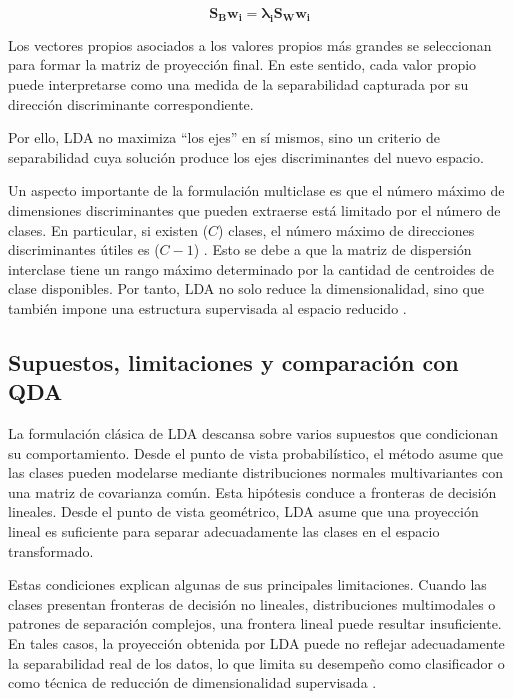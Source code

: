 \begin{equation}
	\mathbf{S_Bw_i = \lambda_iS_Ww_i}
	\label{eq:EMT7}
\end{equation}

Los vectores propios asociados a los valores propios más grandes se seleccionan para formar la matriz de proyección final. En este sentido, cada valor propio puede interpretarse como una medida de la separabilidad capturada por su dirección discriminante correspondiente.

Por ello, LDA no maximiza “los ejes” en sí mismos, sino un criterio de separabilidad cuya solución produce los ejes discriminantes del nuevo espacio.


Un aspecto importante de la formulación multiclase es que el número máximo de dimensiones discriminantes que pueden extraerse está limitado por el número de clases. En particular, si existen ($C$) clases, el número máximo de direcciones discriminantes útiles es ($C-1$) \cite{duda2000pattern}. Esto se debe a que la matriz de dispersión interclase tiene un rango máximo determinado por la cantidad de centroides de clase disponibles. Por tanto, LDA no solo reduce la dimensionalidad, sino que también impone una estructura supervisada al espacio reducido \cite{belhumeur1997eigenfaces}.

\subsection{Supuestos, limitaciones y comparación con QDA}

La formulación clásica de LDA descansa sobre varios supuestos que condicionan su comportamiento. Desde el punto de vista probabilístico, el método asume que las clases pueden modelarse mediante distribuciones normales multivariantes con una matriz de covarianza común. Esta hipótesis conduce a fronteras de decisión lineales. Desde el punto de vista geométrico, LDA asume que una proyección lineal es suficiente para separar adecuadamente las clases en el espacio transformado.

Estas condiciones explican algunas de sus principales limitaciones. Cuando las clases presentan fronteras de decisión no lineales, distribuciones multimodales o patrones de separación complejos, una frontera lineal puede resultar insuficiente. En tales casos, la proyección obtenida por LDA puede no reflejar adecuadamente la separabilidad real de los datos, lo que limita su desempeño como clasificador o como técnica de reducción de dimensionalidad supervisada \cite{mika1999fisher}.



